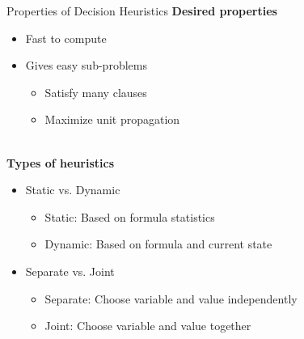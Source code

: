 \documentclass[t]{sdqbeamer}
\begin{document}
\begin{frame}{Properties of Decision Heuristics}
\textbf{Desired properties}\\[1ex]
\begin{itemize}\setlength{\itemsep}{1ex}
	\item Fast to compute
	\item Gives easy sub-problems\\[3pt]
	\pause
	\begin{itemize}\setlength{\itemsep}{1ex}
		\item Satisfy many clauses
		\item Maximize unit propagation
	\end{itemize}
\end{itemize}
~\\
\pause
\textbf{Types of heuristics}\\[1ex]
\pause
\begin{itemize}\setlength{\itemsep}{1ex}
	\item Static vs. Dynamic\\[3pt]
	\begin{itemize}\setlength{\itemsep}{1ex}
		\item Static: Based on formula statistics
		\item Dynamic: Based on formula and current state
	\end{itemize}
	\item Separate vs. Joint\\[3pt]
	\begin{itemize}\setlength{\itemsep}{1ex}
		\item Separate: Choose variable and value independently
		\item Joint: Choose variable and value together
	\end{itemize}
\end{itemize}
\end{frame}
\end{document}
